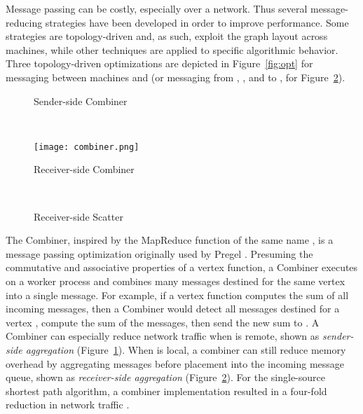 \documentclass[reprint,twocolumn,showpacs,preprintnumbers,amsmath, aps,pre,amssymb]{revtex4-1}
\begin{document}
Message passing can be costly, especially over a network. Thus several message-reducing strategies have been developed in order to improve performance.  Some strategies are topology-driven and, as such, exploit the graph layout across machines, while other techniques are applied to specific algorithmic behavior.  Three topology-driven optimizations are depicted in Figure~\ref{fig:opt} for messaging between machines  and  (or messaging from , , and  to , for Figure~\ref{fig:rec_agg}). 

\begin{figure*}
    \centering
    
    \begin{subfigure}[b]{.3\textwidth}
        \centering
        \caption{Sender-side Combiner}
        \label{fig:send_agg}
    \end{subfigure}
    ~
    \begin{subfigure}[b]{.3\textwidth}
        \centering
        \texttt{[image: combiner.png]}
        \caption{Receiver-side Combiner}
        \label{fig:rec_agg}
    \end{subfigure}
    ~
    \begin{subfigure}[b]{.3\textwidth}
        \centering
        \caption{Receiver-side Scatter}
        \label{fig:rec_scat}
    \end{subfigure}
    
    \caption{Partition-driven optimization strategies for distributed message passing.  The Combiner technique employs both Sender-side and Receiver-side Combiners.}
    \label{fig:opt}
\end{figure*}

The Combiner, inspired by the MapReduce function of the same name \cite{Dean2008}, is a message passing optimization originally used by Pregel \cite{Malewicz2010}.  Presuming the commutative and associative properties of a vertex function, a Combiner executes on a worker process and combines many messages destined for the same vertex into a single message.  For example, if a vertex function computes the sum of all incoming messages, then a Combiner would detect all messages destined for a vertex , compute the sum of the messages, then send the new sum to .  A Combiner can especially reduce network traffic when  is remote, shown as  {\em sender-side aggregation} (Figure~\ref{fig:send_agg}).  When  is local, a combiner can still reduce memory overhead by aggregating messages before placement into the incoming message queue, shown as {\em receiver-side aggregation} (Figure~\ref{fig:rec_agg}). For the single-source shortest path algorithm, a combiner implementation resulted in a four-fold reduction in network traffic \cite{Malewicz2010}.
\end{document}
